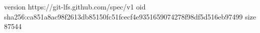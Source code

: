 version https://git-lfs.github.com/spec/v1
oid sha256:ca851a8ac98f2613db85150fc51fcecf4e9351659074278f98df5d516eb97499
size 87544

